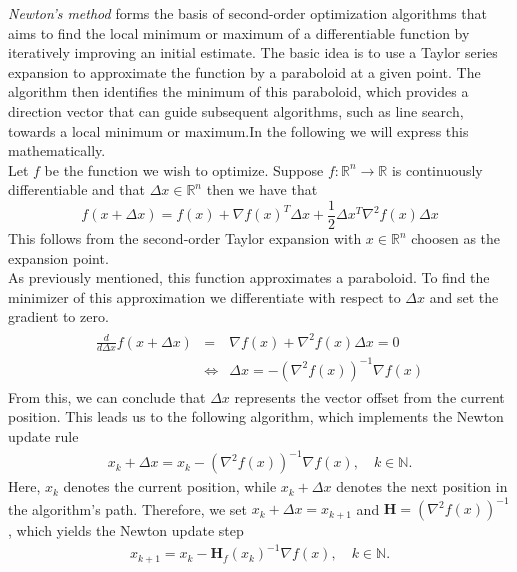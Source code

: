 \emph{Newton's method} forms the basis of second-order optimization algorithms that aims to find the local minimum or maximum of a differentiable function by iteratively improving an initial estimate. 
The basic idea is to use a Taylor series expansion to approximate the function by a paraboloid at a given point.
The algorithm then identifies the minimum of this paraboloid, which provides a direction vector that can guide subsequent algorithms,
such as line search, towards a local minimum or maximum.In the following we will express this mathematically.\\
Let $f$ be the function we wish to optimize. 
Suppose \( f: \mathbb{R}^n \to \mathbb{R} \) is continuously differentiable and that $\Delta x \in \mathbb{R}^n$ then we have
that
\label{eq:taylor}
\begin{equation}
    f(x+\Delta x ) = f(x) + \nabla f(x)^T\Delta x  + \frac{1}{2}\Delta x ^T\nabla^2f(x)\Delta x 
\end{equation}
This follows from the second-order Taylor expansion with $x \in \mathbb{R}^n$ choosen as the expansion point. \cite{nocedal2006numerical}\\
As previously mentioned, this function approximates a paraboloid. To find the minimizer of this approximation we differentiate with respect to $\Delta x $ and set the gradient to zero.
\begin{align}
    \begin{array}{rcl}
    \frac{d}{d\Delta x } f(x+\Delta x ) & = & \nabla f(x) + \nabla^2 f(x) \Delta x  = 0 \\
    & \iff & \Delta x  = -(\nabla^2 f(x))^{-1} \nabla f(x)
    \end{array}
\end{align}
From this, we can conclude that $\Delta x $ represents the vector offset from the current position. This leads us to the following algorithm, which implements the Newton update rule
\begin{align}
x_k + \Delta x  = x_k - (\nabla^2 f(x))^{-1} \nabla f(x), \quad k \in \mathbb{N}.
\end{align}
Here, $x_k$ denotes the current position, while $x_k + \Delta x $ denotes the next position in the algorithm's path. Therefore, we set $x_k + \Delta x  = x_{k+1} $ and $ \mathbf{H} = (\nabla^2 f(x))^{-1} $, which yields the Newton update step \cite{nocedal2006numerical}
\begin{align}\label{eq:newtonstep}
x_{k+1} = x_k - \mathbf{H}_f(x_k)^{-1} \nabla f(x), \quad k \in \mathbb{N}.
\end{align}
